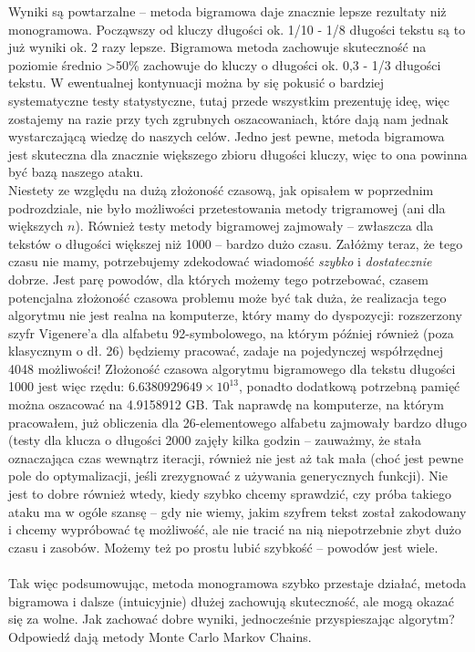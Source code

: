 \documentclass[a4paper]{article}
\begin{document}
Wyniki są powtarzalne – metoda bigramowa daje znacznie lepsze rezultaty niż monogramowa. Począwszy od kluczy długości ok. 1/10 - 1/8 długości tekstu są to już wyniki ok. 2 razy lepsze. Bigramowa metoda zachowuje skuteczność na poziomie średnio >50\% zachowuje do kluczy o długości ok. 0,3 - 1/3  długości tekstu. W ewentualnej kontynuacji można by się pokusić o bardziej systematyczne testy statystyczne, tutaj przede wszystkim prezentuję ideę, więc zostajemy na razie przy tych zgrubnych oszacowaniach, które dają nam jednak wystarczającą wiedzę do naszych celów. Jedno jest pewne, metoda bigramowa jest skuteczna dla znacznie większego zbioru długości kluczy, więc to ona powinna być bazą naszego ataku.\\
Niestety ze względu na dużą złożoność czasową, jak opisałem w poprzednim podrozdziale, nie było możliwości przetestowania metody trigramowej (ani dla większych $n$). Również testy metody bigramowej zajmowały – zwłaszcza dla tekstów o długości większej niż 1000 – bardzo dużo czasu. Załóżmy teraz, że tego czasu nie mamy, potrzebujemy zdekodować wiadomość \textit{szybko} i \textit{dostatecznie} dobrze. Jest parę powodów, dla których możemy tego potrzebować, czasem potencjalna złożoność czasowa problemu może być tak duża, że realizacja tego algorytmu nie jest realna na komputerze, który mamy do dyspozycji: rozszerzony szyfr Vigenere'a dla alfabetu 92-symbolowego, na którym później również (poza klasycznym o dł. 26) będziemy pracować, zadaje na pojedynczej współrzędnej 4048 możliwości! Złożoność czasowa algorytmu bigramowego dla tekstu długości 1000 jest więc rzędu: $6.6380929649 × 10^{13}$, ponadto dodatkową potrzebną pamięć można oszacować na 4.9158912 GB. Tak naprawdę na komputerze, na którym pracowałem, już obliczenia dla 26-elementowego alfabetu zajmowały bardzo długo (testy dla klucza o długości 2000 zajęły kilka godzin – zauważmy, że stała oznaczająca czas wewnątrz iteracji, również nie jest aż tak mała (choć jest pewne pole do optymalizacji, jeśli zrezygnować z używania generycznych funkcji). Nie jest to dobre również wtedy, kiedy szybko chcemy sprawdzić, czy próba takiego ataku ma w ogóle szansę – gdy nie wiemy, jakim szyfrem tekst został zakodowany i chcemy wypróbować tę możliwość, ale nie tracić na nią niepotrzebnie zbyt dużo czasu i zasobów. Możemy też po prostu lubić szybkość – powodów jest wiele.\\\\
Tak więc podsumowując, metoda monogramowa szybko przestaje działać, metoda bigramowa i dalsze (intuicyjnie) dłużej zachowują skuteczność, ale mogą okazać się za wolne. Jak zachować dobre wyniki, jednocześnie przyspieszając algorytm? Odpowiedź dają metody Monte Carlo Markov Chains.
\\
\end{document}
